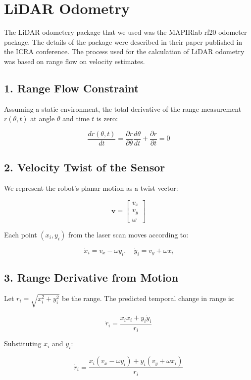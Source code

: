 \newpage
\section*{LiDAR Odometry}
The LiDAR odometery package that we used was the MAPIRlab rf20 odometer package. The details of the package were described in their paper published in the ICRA conference. The process used for the calculation of LiDAR odometry was based on range flow on velocity estimates. 

\subsection*{1. Range Flow Constraint}

Assuming a static environment, the total derivative of the range measurement $r(\theta, t)$ at angle $\theta$ and time $t$ is zero:

\[
\frac{d r(\theta, t)}{dt} = \frac{\partial r}{\partial \theta} \frac{d\theta}{dt} + \frac{\partial r}{\partial t} = 0
\]

\subsection*{2. Velocity Twist of the Sensor}

We represent the robot’s planar motion as a twist vector:

\[
\mathbf{v} = 
\begin{bmatrix}
v_x \\
v_y \\
\omega
\end{bmatrix}
\]

Each point $(x_i, y_i)$ from the laser scan moves according to:

\[
\dot{x}_i = v_x - \omega y_i, \quad \dot{y}_i = v_y + \omega x_i
\]

\subsection*{3. Range Derivative from Motion}

Let $r_i = \sqrt{x_i^2 + y_i^2}$ be the range. The predicted temporal change in range is:

\[
\dot{r}_i = \frac{x_i \dot{x}_i + y_i \dot{y}_i}{r_i}
\]

Substituting $\dot{x}_i$ and $\dot{y}_i$:

\[
\dot{r}_i = \frac{x_i (v_x - \omega y_i) + y_i (v_y + \omega x_i)}{r_i}
\]

